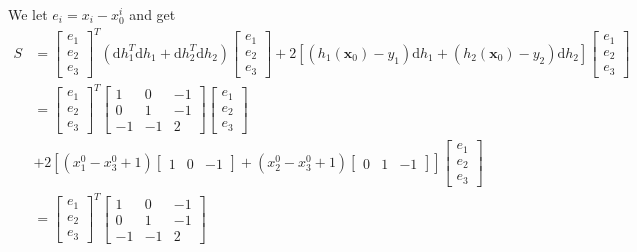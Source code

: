 We let $e_i = x_i - x_0^i$ and get
$$
\begin{aligned}
  S & = \begin{bmatrix}
    e_1 \\ e_2 \\ e_3
  \end{bmatrix}^T \left( \mathrm{d} h_1^T \mathrm{d} h_1 + \mathrm{d} h_2^T \mathrm{d} h_2 \right) \begin{bmatrix}
    e_1 \\ e_2 \\ e_3
  \end{bmatrix} + 2 \left[ (h_1(\mathbf{x}_0) - y_1) \mathrm{d}h_1 + (h_2(\mathbf{x}_0) - y_2)\mathrm{d}h_2 \right] \begin{bmatrix}
    e_1 \\ e_2 \\ e_3
  \end{bmatrix} \\
  & = \begin{bmatrix}
    e_1 \\ e_2 \\ e_3
  \end{bmatrix}^T \begin{bmatrix}
    1 & 0 & -1 \\ 0 & 1 & -1 \\ -1 & -1 & 2
  \end{bmatrix} \begin{bmatrix}
    e_1 \\ e_2 \\ e_3
  \end{bmatrix} \\
  & + 2 \left[ (x_1^0 - x_3^0 +1) \begin{bmatrix}
    1 & 0 & -1
  \end{bmatrix} + (x_2^0 - x_3^0 + 1) \begin{bmatrix}
    0 & 1 & -1
  \end{bmatrix} \right] \begin{bmatrix}
    e_1 \\ e_2 \\ e_3
  \end{bmatrix} \\
  & = \begin{bmatrix}
    e_1 \\ e_2 \\ e_3
  \end{bmatrix}^T \begin{bmatrix}
    1 & 0 & -1 \\ 0 & 1 & -1 \\ -1 & -1 & 2

\end{bmatrix}
\end{aligned}$$
